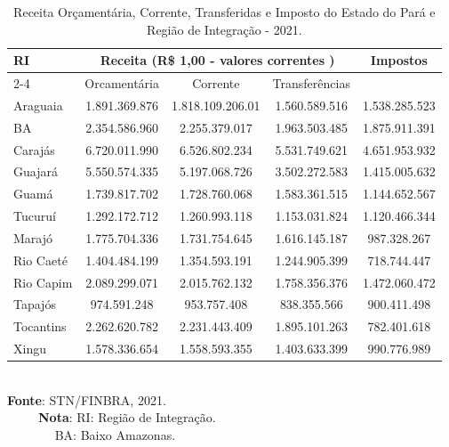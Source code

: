 \begin{table}[h]
\centering
    {
    \caption{Receita Orçamentária, Corrente, Transferidas e Imposto do Estado do Pará e Região de Integração - 2021.}
    \label{obitos2}
    \vspace{0.1cm}
\begin{tabular}{l|c|c|c|c}
\hline\hline 
\multirow{2}{*}{RI} & \multicolumn{3}{c|}{Receita (R\$ 1,00 - valores correntes )}                                                     & \multirow{2}{*}{Impostos} \\ \cline{2-4}
                           & \multicolumn{1}{c|}{Orcamentária} & \multicolumn{1}{c|}{Corrente} & Transferências &  \\ 
\hline\hline                           
Araguaia           &  1.891.369.876 & 1.818.109.206.01 & 1.560.589.516 & 1.538.285.523 \\
BA                 &  2.354.586.960 & 2.255.379.017    & 1.963.503.485 & 1.875.911.391 \\
Carajás            &  6.720.011.990 & 6.526.802.234    & 5.531.749.621 & 4.651.953.932 \\
Guajará            &  5.550.574.335 & 5.197.068.726    & 3.502.272.583 & 1.415.005.632 \\
Guamá              &  1.739.817.702 & 1.728.760.068    & 1.583.361.515 & 1.144.652.567 \\
Tucuruí            &  1.292.172.712 & 1.260.993.118    & 1.153.031.824 & 1.120.466.344 \\
Marajó             &  1.775.704.336 & 1.731.754.645    & 1.616.145.187 & 987.328.267   \\
Rio Caeté          &  1.404.484.199 & 1.354.593.191    & 1.244.905.399 &  718.744.447  \\
Rio Capim          &  2.089.299.071 & 2.015.762.132    & 1.758.356.376 &  1.472.060.472 \\
Tapajós            &  974.591.248   & 953.757.408      & 838.355.566   &  900.411.498  \\
Tocantins          &  2.262.620.782 & 2.231.443.409    & 1.895.101.263 &  782.401.618 \\
Xingu              &  1.578.336.654 & 1.558.593.355    & 1.403.633.399 &  990.776.989 \\                   
\hline\hline
\end{tabular}}
\\ 
\hspace{-8.2cm}
\textbf{Fonte}: STN/FINBRA, 2021. \\
\hspace{-8.3cm}
\ \ \ \ \ \textbf{Nota}: RI: Região de Integração. \\
\hspace{-8.3cm}
\ \ \ \ \ \ \ \textbf{} BA: Baixo Amazonas. 
\end{table}


